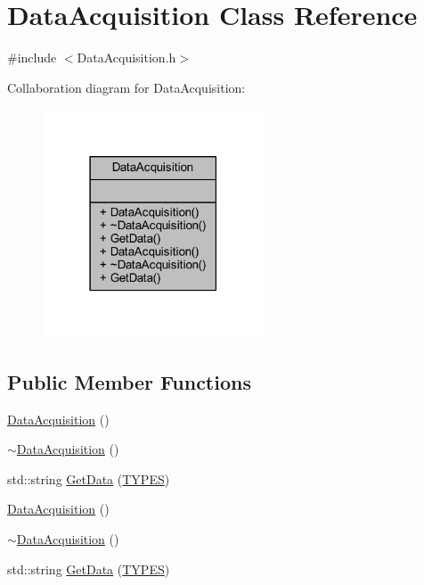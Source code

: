 \hypertarget{class_data_acquisition}{}\section{Data\+Acquisition Class Reference}
\label{class_data_acquisition}


{\ttfamily \#include $<$Data\+Acquisition.\+h$>$}



Collaboration diagram for Data\+Acquisition\+:
\nopagebreak
\begin{figure}[H]
\begin{center}
\leavevmode
\includegraphics[width=186pt]{class_data_acquisition__coll__graph}
\end{center}
\end{figure}
\subsection*{Public Member Functions}
\begin{DoxyCompactItemize}
\item 
\mbox{\hyperlink{class_data_acquisition_a219a57019cb7f899040d2d852790b0cf}{Data\+Acquisition}} ()
\item 
\mbox{\hyperlink{class_data_acquisition_ab3abaaa3e35419b5de6efdeb76747bec}{$\sim$\+Data\+Acquisition}} ()
\item 
std\+::string \mbox{\hyperlink{class_data_acquisition_ad737fcbfe342830dae2a3b46b63d3dbd}{Get\+Data}} (\mbox{\hyperlink{_class_adapter_2_class_adapter_2_data_8h_aacb79576e5cf053ee9c93cb9d665e32b}{T\+Y\+P\+ES}})
\item 
\mbox{\hyperlink{class_data_acquisition_a219a57019cb7f899040d2d852790b0cf}{Data\+Acquisition}} ()
\item 
\mbox{\hyperlink{class_data_acquisition_ab3abaaa3e35419b5de6efdeb76747bec}{$\sim$\+Data\+Acquisition}} ()
\item 
std\+::string \mbox{\hyperlink{class_data_acquisition_ad737fcbfe342830dae2a3b46b63d3dbd}{Get\+Data}} (\mbox{\hyperlink{_class_adapter_2_class_adapter_2_data_8h_aacb79576e5cf053ee9c93cb9d665e32b}{T\+Y\+P\+ES}})
\end{DoxyCompactItemize}


